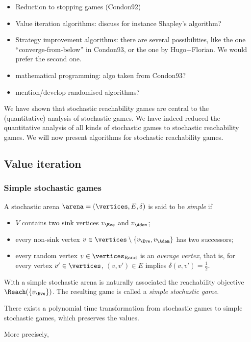 {\color{gray} \begin{itemize}
\item Reduction to stopping games (Condon92)
\item Value iteration algorithms: discuss for instance Shapley's
  algorithm?
\item Strategy improvement algorithms: there are several
  possibilities, like the one ``converge-from-below'' in Condon93, or
  the one by Hugo+Florian. We would prefer the second one.
\item mathematical programming: algo taken from Condon93?
\item mention/develop randomised algorithms? 
\end{itemize}
}

We have shown that stochastic reachability games are central to the (quantitative) analysis of stochastic games. 
We have indeed reduced the quantitative analysis of all kinds of stochastic games to stochastic reachability games. We will now present algorithms for stochastic reachability games.

\subsection{Value iteration}

\subsubsection{Simple stochastic games}


\begin{definition}
  A stochastic arena $\arena = (\vertices,E,\delta)$ is said to be
  \emph{simple} if
  \begin{itemize}
  \item $V$ contains two sink vertices $v_{\Eve}$ and $v_{\Adam}$;
  \item every non-sink vertex
    $v \in \vertices \setminus \{v_{\Eve},v_{\Adam}\}$ has two
    successors;
  \item every random vertex $v \in \Randomvertices$ is an
    \emph{average vertex}, that is, for every vertex
    $v'\in \vertices$, $(v,v') \in E$ implies
    $\delta(v,v')=\frac{1}{2}$.
  \end{itemize}
\end{definition}

With a simple stochastic arena is naturally associated the
reachability objective $\Reach(\{v_{\Eve}\})$. The resulting game is
called a \emph{simple stochastic game}.
\begin{proposition}
  There exists a polynomial time transformation from stochastic games
  to simple stochastic games, which preserves the values.
\end{proposition}
More precisely, 

